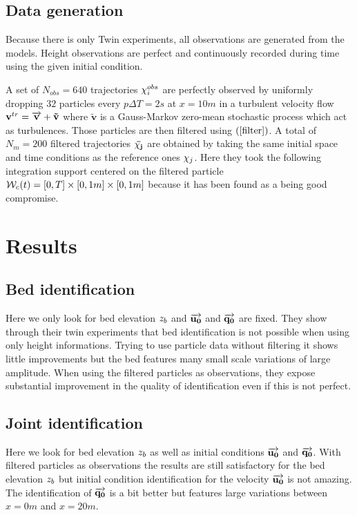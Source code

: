 \subsection{Data generation}

Because there is only Twin experiments, all observations are generated from the models.
Height observations are perfect and continuously recorded during time using the given initial condition.

\vskip 0.3cm
A set of $N_{obs} = 640$ trajectories $\mathbf{\chi}_i^{obs}$ are perfectly observed by uniformly dropping $32$ particles every $p\Delta T = 2s$ at $x = 10m$ in a turbulent velocity flow $\mathbf{v}^{tr} = \overrightarrow{\mathbf{v}} + \mathbf{\tilde{v}}$ where $\mathbf{\tilde{v}}$ is a Gauss-Markov zero-mean stochastic process which act as turbulences. 
Those particles are then filtered using $(\ref{filter})$. A total of $N_m = 200$ filtered trajectories $\mathbf{\bar{\chi_j}}$ are obtained by taking the same initial space and time conditions as the reference ones $\mathbf{\chi}_j$. Here they took the following integration support centered on the filtered particle $\mathcal{W}_c(t) = [0,T] \times [0,1m] \times [0,1m]$ because it has been found as a being good compromise.


\clearpage

\section{Results}
\subsection{Bed identification}
    
Here we only look for bed elevation $z_b$ and $\overrightarrow{\mathbf{u_0}}$ and $\overrightarrow{\mathbf{q_0}}$ are fixed.
They show through their twin experiments that bed identification is not possible when using only height informations. 
Trying to use particle data without filtering it shows little improvements but the bed features many small scale variations of large amplitude.
When using the filtered particles as observations, they expose substantial improvement in the quality of identification even if this is not perfect.

\subsection{Joint identification}
    
Here we look for bed elevation $z_b$ as well as initial conditions $\overrightarrow{\mathbf{u_0}}$ and $\overrightarrow{\mathbf{q_0}}$.
With filtered particles as observations the results are still satisfactory for the bed elevation $z_b$ but initial condition identification for the velocity $\overrightarrow{\mathbf{u_0}}$ is not amazing. The identification of $\overrightarrow{\mathbf{q_0}}$ is a bit better but features large variations between $x=0m$ and $x=20m$.

